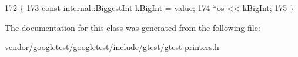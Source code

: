 \begin{DoxyCode}
172                                                          \{
173     \textcolor{keyword}{const} \hyperlink{namespacetesting_1_1internal_a05c6bd9ede5ccdf25191a590d610dcc6}{internal::BiggestInt} kBigInt = value;
174     *os << kBigInt;
175   \}
\end{DoxyCode}


The documentation for this class was generated from the following file\+:\begin{DoxyCompactItemize}
\item 
vendor/googletest/googletest/include/gtest/\hyperlink{gtest-printers_8h}{gtest-\/printers.\+h}\end{DoxyCompactItemize}
